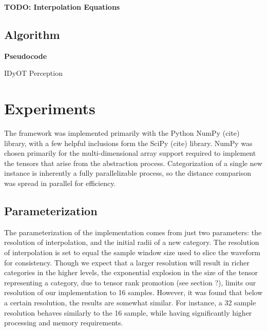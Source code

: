 \documentclass[runningheads]{llncs}
\begin{document}
\textbf{TODO: Interpolation Equations}


\subsection{Algorithm}

\textbf{Pseudocode}

\begin{algorithm}[H]
  \caption{IDyOT Perception}
\end{algorithm}



\section{Experiments}

The framework was implemented primarily with the Python NumPy (cite) library, with a few helpful inclusions form the SciPy (cite) library.  NumPy was chosen primarily for the multi-dimensional array support required to implement the tensors that arise from the abstraction process.  Categorization of a single new instance is inherently a fully parallelizable process, so the distance comparison was spread in parallel for efficiency.

\subsection{Parameterization}

The parameterization of the implementation comes from just two parameters: the resolution of interpolation, and the initial radii of a new category.  The resolution of interpolation is set to equal the sample window size used to slice the waveform for consistency.  Though we expect that a larger resolution will result in richer categories in the higher levels, the exponential explosion in the size of the tensor representing a category, due to tensor rank promotion (see section ?), limits our resolution of our implementation to 16 samples.  However, it was found that below a certain resolution, the results are somewhat similar.  For instance, a 32 sample resolution behaves similarly to the 16 sample, while having significantly higher processing and memory requirements.
\end{document}

